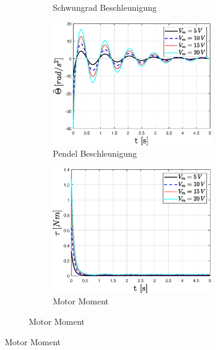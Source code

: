 \begin{figure}
\begin{figure}
\begin{subfigure}[b]{0.49 \linewidth}
        \caption{Schwungrad Beschleunigung}
        \label{fig:Vm_sprung_phi_punkt_punkt}
    \end{subfigure}
    \begin{subfigure}[b]{0.49 \linewidth}
        \includegraphics[width=\linewidth]{Bilder/5_sensi/fig/Vm_sprung/theta_punkt_punkt.eps}
        \caption{Pendel Beschleunigung}
        \label{fig:Vm_sprung_theta_punkt_punkt}
    \end{subfigure}
    \begin{subfigure}[b]{0.49\linewidth}
        \includegraphics[width=\linewidth]{Bilder/5_sensi/fig/Vm_sprung/tau.eps}
        \caption{Motor Moment}

\end{subfigure}
\end{figure}
\end{figure}
